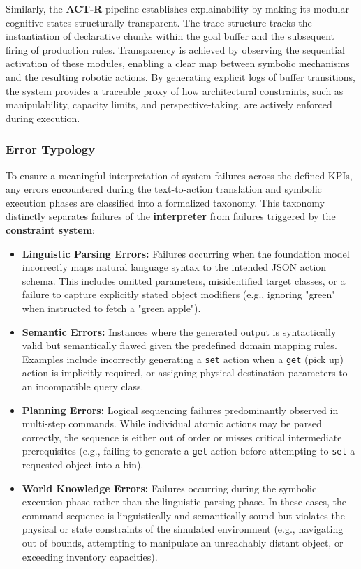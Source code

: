 \documentclass[a4paper]{article}
\begin{document}
Similarly, the \textbf{ACT-R} pipeline establishes explainability by making its modular cognitive states structurally transparent. The trace structure tracks the instantiation of declarative chunks within the goal buffer and the subsequent firing of production rules. Transparency is achieved by observing the sequential activation of these modules, enabling a clear map between symbolic mechanisms and the resulting robotic actions. By generating explicit logs of buffer transitions, the system provides a traceable proxy of how architectural constraints, such as manipulability, capacity limits, and perspective-taking, are actively enforced during execution.

\subsubsection{Error Typology}
To ensure a meaningful interpretation of system failures across the defined KPIs, any errors encountered during the text-to-action translation and symbolic execution phases are classified into a formalized taxonomy. This taxonomy distinctly separates failures of the \textbf{interpreter} from failures triggered by the \textbf{constraint system}:

\begin{itemize}
    \item \textbf{Linguistic Parsing Errors:} Failures occurring when the foundation model incorrectly maps natural language syntax to the intended JSON action schema. This includes omitted parameters, misidentified target classes, or a failure to capture explicitly stated object modifiers (e.g., ignoring "green" when instructed to fetch a "green apple").
    \item \textbf{Semantic Errors:} Instances where the generated output is syntactically valid but semantically flawed given the predefined domain mapping rules. Examples include incorrectly generating a \texttt{set} action when a \texttt{get} (pick up) action is implicitly required, or assigning physical destination parameters to an incompatible query class.
    \item \textbf{Planning Errors:} Logical sequencing failures predominantly observed in multi-step commands. While individual atomic actions may be parsed correctly, the sequence is either out of order or misses critical intermediate prerequisites (e.g., failing to generate a \texttt{get} action before attempting to \texttt{set} a requested object into a bin).
    \item \textbf{World Knowledge Errors:} Failures occurring during the symbolic execution phase rather than the linguistic parsing phase. In these cases, the command sequence is linguistically and semantically sound but violates the physical or state constraints of the simulated environment (e.g., navigating out of bounds, attempting to manipulate an unreachably distant object, or exceeding inventory capacities).
\end{itemize}
\end{document}
